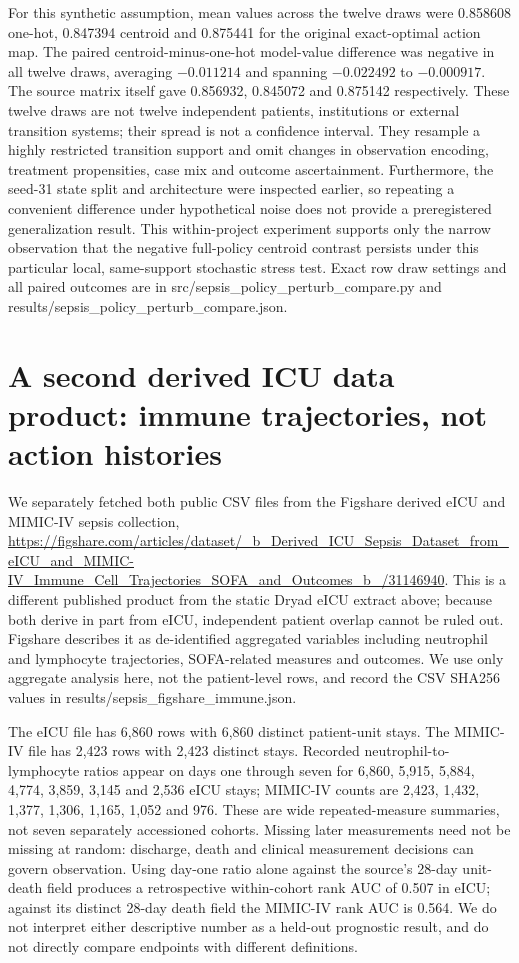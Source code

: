 For this synthetic assumption, mean values across the twelve draws were 0.858608 one-hot, 0.847394 centroid and 0.875441 for the original exact-optimal action map. The paired centroid-minus-one-hot model-value difference was negative in all twelve draws, averaging $-0.011214$ and spanning $-0.022492$ to $-0.000917$. The source matrix itself gave 0.856932, 0.845072 and 0.875142 respectively. These twelve draws are not twelve independent patients, institutions or external transition systems; their spread is not a confidence interval. They resample a highly restricted transition support and omit changes in observation encoding, treatment propensities, case mix and outcome ascertainment. Furthermore, the seed-31 state split and architecture were inspected earlier, so repeating a convenient difference under hypothetical noise does not provide a preregistered generalization result. This within-project experiment supports only the narrow observation that the negative full-policy centroid contrast persists under this particular local, same-support stochastic stress test. Exact row draw settings and all paired outcomes are in src/sepsis\_policy\_perturb\_compare.py and results/sepsis\_policy\_perturb\_compare.json.

\section{A second derived ICU data product: immune trajectories, not action histories}
We separately fetched both public CSV files from the Figshare derived eICU and MIMIC-IV sepsis collection, \url{https://figshare.com/articles/dataset/\_b\_Derived\_ICU\_Sepsis\_Dataset\_from\_eICU\_and\_MIMIC-IV\_Immune\_Cell\_Trajectories\_SOFA\_and\_Outcomes\_b\_/31146940}. This is a different published product from the static Dryad eICU extract above; because both derive in part from eICU, independent patient overlap cannot be ruled out. Figshare describes it as de-identified aggregated variables including neutrophil and lymphocyte trajectories, SOFA-related measures and outcomes. We use only aggregate analysis here, not the patient-level rows, and record the CSV SHA256 values in results/sepsis\_figshare\_immune.json.

The eICU file has 6,860 rows with 6,860 distinct patient-unit stays. The MIMIC-IV file has 2,423 rows with 2,423 distinct stays. Recorded neutrophil-to-lymphocyte ratios appear on days one through seven for 6,860, 5,915, 5,884, 4,774, 3,859, 3,145 and 2,536 eICU stays; MIMIC-IV counts are 2,423, 1,432, 1,377, 1,306, 1,165, 1,052 and 976. These are wide repeated-measure summaries, not seven separately accessioned cohorts. Missing later measurements need not be missing at random: discharge, death and clinical measurement decisions can govern observation. Using day-one ratio alone against the source's 28-day unit-death field produces a retrospective within-cohort rank AUC of 0.507 in eICU; against its distinct 28-day death field the MIMIC-IV rank AUC is 0.564. We do not interpret either descriptive number as a held-out prognostic result, and do not directly compare endpoints with different definitions.

